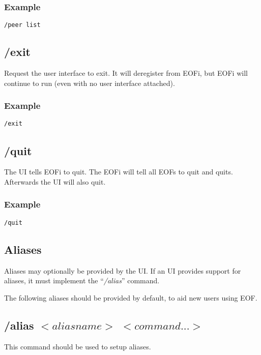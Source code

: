 \documentclass[12pt,a4paper]{book}
\begin{document}
\subsubsection{Example}
\begin{verbatim}
/peer list
\end{verbatim}
\subsection{/exit}
Request the user interface to exit. It will deregister from EOFi,
but EOFi will continue to run (even with no user interface attached).
\subsubsection{Example}
\begin{verbatim}
/exit
\end{verbatim}
\subsection{/quit}
The UI tells EOFi to quit.
The EOFi will tell all EOFs to quit and quits.
Afterwards the UI will also quit.
\subsubsection{Example}
\begin{verbatim}
/quit
\end{verbatim}
\subsection{Aliases}
Aliases may optionally be provided by the UI. If an UI provides
support for aliases, it must implement the "`\emph{/alias}"' command.

The following aliases should be provided by default,
to aid new users using EOF.
\subsection{/alias $<aliasname>$ $<command...>$}
This command should be used to setup aliases.
\end{document}
